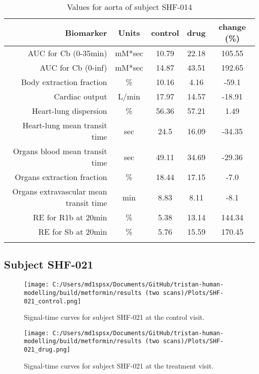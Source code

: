 \documentclass{epflreport}%
\begin{document}
\begin{longtable}{rcccc}%
\hline%
Biomarker&Units&control&drug&change (\%)\\%
\hline%
AUC for Cb (0{-}35min)&mM*sec&10.79&22.18&105.55\\%
AUC for Cb (0{-}inf)&mM*sec&14.87&43.51&192.65\\%
Body extraction fraction&\%&10.16&4.16&{-}59.1\\%
Cardiac output&L/min&17.97&14.57&{-}18.91\\%
Heart{-}lung dispersion&\%&56.36&57.21&1.49\\%
Heart{-}lung mean transit time&sec&24.5&16.09&{-}34.35\\%
Organs blood mean transit time&sec&49.11&34.69&{-}29.36\\%
Organs extraction fraction&\%&18.44&17.15&{-}7.0\\%
Organs extravascular mean transit time&min&8.83&8.11&{-}8.1\\%
RE for R1b at 20min&\%&5.38&13.14&144.34\\%
RE for Sb at 20min&\%&5.76&15.59&170.45\\%
\hline%
\caption{Values for aorta of subject SHF-014} \\%
\end{longtable}%
\clearpage%
\subsection{Subject SHF{-}021}%
\label{subsec:SubjectSHF{-}021}%

%


\begin{figure}[h!]%
\centering%
\texttt{[image: C:/Users/md1spsx/Documents/GitHub/tristan-human-modelling/build/metformin/results (two scans)/Plots/SHF-021\_control.png]}%
\caption{Signal{-}time curves for subject SHF{-}021 at the control visit.}%
\end{figure}

%


\begin{figure}[h!]%
\centering%
\texttt{[image: C:/Users/md1spsx/Documents/GitHub/tristan-human-modelling/build/metformin/results (two scans)/Plots/SHF-021\_drug.png]}%
\caption{Signal{-}time curves for subject SHF{-}021 at the treatment visit.}%
\end{figure}
\end{document}
